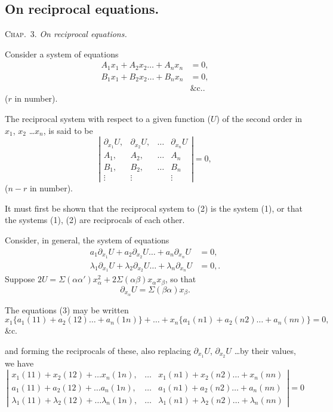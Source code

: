 \documentclass[11pt,a4paper]{article}
\theoremstyle{plain}
\theoremstyle{definition}
\theoremstyle{remark}
\begin{document}
\newpage
\subsection{On reciprocal equations.}

\textsc{Chap.\ 3.} \textit{On reciprocal equations.}

Consider a system of equations
\begin{align*}
A_1 x_1 + A_2 x_2 \ldots + A_n x_n &= 0, \\
B_1 x_1 + B_2 x_2 \ldots + B_n x_n &= 0, \\
&\text{\&c.} \tag{1}.
\end{align*}
($r$ in number).

The reciprocal system with respect to a given function ($U$) of the second order
in $x_1$, $x_2$ \ldots $x_n$, is said to be
\[
\left|
\begin{array}{ccccc}
\partial_{x_1} U, & \partial_{x_2} U, & \ldots & \partial_{x_n} U \\
A_1, & A_2, & \ldots & A_n \\
B_1, & B_2, & \ldots & B_n \\
\vdots & \vdots & & \vdots
\end{array}
\right| = 0
\tag{2},
\]
($n-r$ in number).

It must first be shown that the reciprocal system to (2) is the system (1), or
that the systems (1), (2) are reciprocals of each other.

Consider, in general, the system of equations
\begin{align*}
a_1 \partial_{x_1} U + a_2 \partial_{x_2} U \ldots + a_n \partial_{x_n} U &= 0, \\
\lambda_1 \partial_{x_1} U + \lambda_2 \partial_{x_2} U \ldots + \lambda_n \partial_{x_n} U &= 0,
\tag{3}.
\end{align*}
Suppose $2U = \Sigma(\alpha\alpha') x_\alpha^2 + 2\Sigma(\alpha\beta) x_\alpha x_\beta$, so that
\[
\partial_{x_\alpha} U = \Sigma(\beta\alpha) x_\beta \tag{4}.
\]

The equations (3) may be written
\[
x_1 \{a_1(11) + a_2(12) \ldots + a_n(1n)\} + \ldots + x_n \{a_1(n1) + a_2(n2) \ldots + a_n(nn)\} = 0
\tag{6},
\]
\&c.

and forming the reciprocals of these, also replacing $\partial_{x_1} U$, $\partial_{x_2} U$ \ldots by their values, we
have
\[
\left|
\begin{array}{cccc}
x_1(11) + x_2(12) + \ldots x_n(1n), & \ldots & x_1(n1) + x_2(n2) \ldots + x_n(nn) \\
a_1(11) + a_2(12) + \ldots a_n(1n), & \ldots & a_1(n1) + a_2(n2) \ldots + a_n(nn) \\
\lambda_1(11) + \lambda_2(12) + \ldots \lambda_n(1n), & \ldots & \lambda_1(n1) + \lambda_2(n2) \ldots + \lambda_n(nn)
\end{array}
\right| = 0
\]
\end{document}
